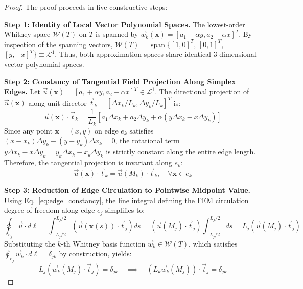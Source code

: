 \documentclass[preprint,12pt]{elsarticle}
\begin{document}
\begin{proof}
    The proof proceeds in five constructive steps:

    \textbf{Step 1: Identity of Local Vector Polynomial Spaces.}
    The lowest-order Whitney space $\mathcal{W}(T)$ on $T$ is spanned by $\vec{w}_k(\mathbf{x}) = [a_1 + \alpha y, a_2 - \alpha x]^T$. By inspection of the spanning vectors, $\mathcal{W}(T) = \operatorname{span}\{[1,0]^T$, $[0,1]^T$, $[y,-x]^T\} \equiv \mathcal{L}^1$. Thus, both approximation spaces share identical 3-dimensional vector polynomial spaces.

    \textbf{Step 2: Constancy of Tangential Field Projection Along Simplex Edges.}
    Let $\vec{u}(\mathbf{x}) = [a_1 + \alpha y, a_2 - \alpha x]^T \in \mathcal{L}^1$. The directional projection of $\vec{u}(\mathbf{x})$ along unit director $\vec{t}_k = [\Delta x_k / L_k, \Delta y_k / L_k]^T$ is:
    \begin{equation}
        \vec{u}(\mathbf{x}) \cdot \vec{t}_k = \frac{1}{L_k} \left[ a_1 \Delta x_k + a_2 \Delta y_k + \alpha (y \Delta x_k - x \Delta y_k) \right]
    \end{equation}
    Since any point $\mathbf{x} = (x,y)$ on edge $e_k$ satisfies $(x - x_k)\Delta y_k - (y - y_k)\Delta x_k = 0$, the rotational term $y \Delta x_k - x \Delta y_k = y_k \Delta x_k - x_k \Delta y_k$ is strictly constant along the entire edge length. Therefore, the tangential projection is invariant along $e_k$:
    \begin{equation}
        \vec{u}(\mathbf{x}) \cdot \vec{t}_k = \vec{u}(M_k) \cdot \vec{t}_k, \quad \forall \mathbf{x} \in e_k
        \label{eq:edge_constancy}
    \end{equation}

    \textbf{Step 3: Reduction of Edge Circulation to Pointwise Midpoint Value.}
    Using Eq.~\eqref{eq:edge_constancy}, the line integral defining the FEM circulation degree of freedom along edge $e_j$ simplifies to:
    \begin{equation}
        \oint_{e_j} \vec{u} \cdot d\boldsymbol{\ell} = \int_{-L_j/2}^{L_j/2} \left( \vec{u}(\mathbf{x}(s)) \cdot \vec{t}_j \right) ds = \left( \vec{u}(M_j) \cdot \vec{t}_j \right) \int_{-L_j/2}^{L_j/2} ds = L_j \left( \vec{u}(M_j) \cdot \vec{t}_j \right)
    \end{equation}
    Substituting the $k$-th Whitney basis function $\vec{w}_k \in \mathcal{W}(T)$, which satisfies $\oint_{e_j} \vec{w}_k \cdot d\boldsymbol{\ell} = \delta_{jk}$ by construction, yields:
    \begin{equation}
        L_j \left( \vec{w}_k(M_j) \cdot \vec{t}_j \right) = \delta_{jk} \quad \implies \quad \left( L_k \vec{w}_k(M_j) \right) \cdot \vec{t}_j = \delta_{jk}
        \label{eq:whitney_midpoint_proj}
    \end{equation}


\end{proof}
\end{document}
